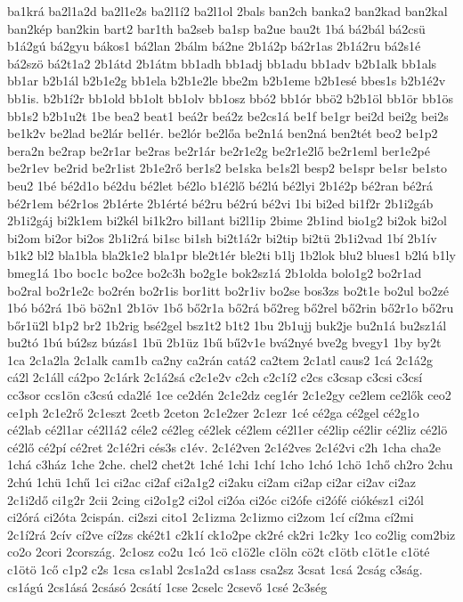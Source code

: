{ba1krá
ba2l1a2d
ba2l1e2s
ba2l1í2
ba2l1ol
2bals
ban2ch
banka2
ban2kad
ban2kal
ban2kép
ban2kin
bart2
bar1th
ba2seb
ba1sp
ba2ue
bau2t
1bá
bá2bál
bá2csü
b1á2gú
bá2gyu
bákos1
bá2lan
2bálm
bá2ne
2b1á2p
bá2r1as
2b1á2ru
bá2s1é
bá2szö
bá2t1a2
2b1átd
2b1átm
bb1adh
bb1adj
bb1adu
bb1adv
b2b1alk
bb1als
bb1ar
b2b1ál
b2b1e2g
bb1ela
b2b1e2le
bbe2m
b2b1eme
b2b1esé
bbes1s
b2b1é2v
bb1is.
b2b1í2r
bb1old
bb1olt
bb1olv
bb1osz
bbó2
bb1ór
bbö2
b2b1öl
bb1ör
bb1ös
bb1s2
b2b1u2t
1be
bea2
beat1
beá2r
beá2z
be2cs1á
be1f
be1gr
bei2d
bei2g
bei2s
be1k2v
be2lad
be2lár
bel1ér.
be2lór
be2lőa
be2n1á
ben2ná
ben2tét
beo2
be1p2
bera2n
be2rap
be2r1ar
be2ras
be2r1ár
be2r1e2g
be2r1e2lő
be2r1eml
ber1e2pé
be2r1ev
be2rid
be2r1ist
2b1e2rő
ber1s2
be1ska
be1s2l
besp2
be1spr
be1sr
be1sto
beu2
1bé
bé2d1o
bé2du
bé2let
bé2lo
b1é2lő
bé2lú
bé2lyi
2b1é2p
bé2ran
bé2rá
bé2r1em
bé2r1os
2b1érte
2b1érté
bé2ru
bé2rú
bé2vi
1bi
bi2ed
bi1f2r
2b1i2gáb
2b1i2gáj
bi2k1em
bi2kél
bi1k2ro
bil1ant
bi2l1ip
2bime
2b1ind
bio1g2
bi2ok
bi2ol
bi2om
bi2or
bi2os
2b1i2rá
bi1sc
bi1sh
bi2t1á2r
bi2tip
bi2tü
2b1i2vad
1bí
2b1ív
b1k2
bl2
bla1bla
bla2k1e2
bla1pr
ble2t1ér
ble2ti
b1lj
1b2lok
blu2
blues1
b2lú
b1ly
bmeg1á
1bo
boc1c
bo2ce
bo2c3h
bo2g1e
bok2sz1á
2b1olda
bolo1g2
bo2r1ad
bo2ral
bo2r1e2c
bo2rén
bo2r1is
bor1itt
bo2r1iv
bo2se
bos3zs
bo2t1e
bo2ul
bo2zé
1bó
bó2rá
1bö
bö2n1
2b1öv
1bő
bő2r1a
bő2rá
bő2reg
bő2rel
bő2rin
bő2r1o
bő2ru
bőr1ü2l
b1p2
br2
1b2rig
bsé2gel
bsz1t2
b1t2
1bu
2b1ujj
buk2je
bu2n1á
bu2sz1ál
bu2tó
1bú
bú2sz
búzás1
1bü
2b1üz
1bű
bű2v1e
bvá2nyé
bve2g
bvegy1
1by
by2t
1ca
2c1a2la
2c1alk
cam1b
ca2ny
ca2rán
catá2
ca2tem
2c1atl
caus2
1cá
2c1á2g
cá2l
2c1áll
cá2po
2c1árk
2c1á2sá
c2c1e2v
c2ch
c2c1í2
c2cs
c3csap
c3csi
c3csí
cc3sor
ccs1ön
c3csú
cda2lé
1ce
ce2dén
2c1e2dz
ceg1ér
2c1e2gy
ce2lem
ce2lők
ceo2
ce1ph
2c1e2rő
2c1eszt
2cetb
2ceton
2c1e2zer
2c1ezr
1cé
cé2ga
cé2gel
cé2g1o
cé2lab
cé2l1ar
cé2l1á2
céle2
cé2leg
cé2lek
cé2lem
cé2l1er
cé2lip
cé2lir
cé2liz
cé2lö
cé2lő
cé2pí
cé2ret
2c1é2ri
cés3s
c1év.
2c1é2ven
2c1é2ves
2c1é2vi
c2h
1cha
cha2e
1chá
c3ház
1che
2che.
chel2
chet2t
1ché
1chi
1chí
1cho
1chó
1chö
1chő
ch2ro
2chu
2chú
1chü
1chű
1ci
ci2ac
ci2af
ci2a1g2
ci2aku
ci2am
ci2ap
ci2ar
ci2av
ci2az
2c1i2dő
ci1g2r
2cii
2cing
ci2o1g2
ci2ol
ci2óa
ci2óc
ci2ófe
ci2ófé
ciókész1
ci2ól
ci2órá
ci2óta
2cispán.
ci2szi
cito1
2c1izma
2c1izmo
ci2zom
1cí
cí2ma
cí2mi
2c1í2rá
2cív
cí2ve
cí2zs
cké2t1
c2k1í
ck1o2pe
ck2ré
ck2ri
1c2ky
1co
co2lig
com2biz
co2o
2cori
2cország.
2c1osz
co2u
1có
1cö
c1ö2le
c1öln
cö2t
c1ötb
c1öt1e
c1öté
c1ötö
1cő
c1p2
c2s
1csa
cs1abl
2cs1a2d
cs1ass
csa2sz
3csat
1csá
2cság
c3ság.
cs1ágú
2cs1ásá
2csásó
2csátí
1cse
2cselc
2csevő
1csé
2c3ség
}
